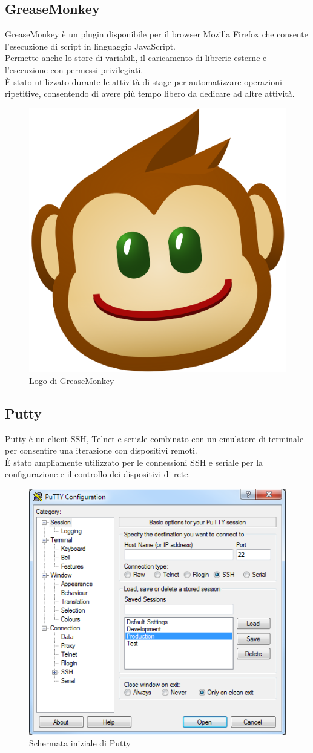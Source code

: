 \documentclass[Tesi.tex]{subfiles}
\begin{document}
\subsection{GreaseMonkey}
GreaseMonkey è un plugin disponibile per il browser Mozilla Firefox che consente l'esecuzione di script in linguaggio JavaScript. \\
Permette anche lo store di variabili, il caricamento di librerie esterne e l'esecuzione con permessi privilegiati. \\
\`{E} stato utilizzato durante le attività di stage per automatizzare operazioni ripetitive, consentendo di avere più tempo libero da dedicare ad altre attività.
\begin{figure}[H]
	\centering
	\includegraphics[width=0.14\linewidth]{"images/logo/GreaseMonkey_logo"}
	\caption{Logo di GreaseMonkey}
	\label{fig:Logo di GreaseMonkey}
\end{figure}

\subsection{Putty}
Putty è un client SSH, Telnet e seriale combinato con un emulatore di terminale per consentire una iterazione con dispositivi remoti. \\
\`{E} stato ampliamente utilizzato per le connessioni SSH e seriale per la configurazione e il controllo dei dispositivi di rete.
\begin{figure}[H]
	\centering
	\includegraphics[width=0.62\linewidth]{"images/putty"}
	\caption{Schermata iniziale di Putty}
	\label{fig:Schermata iniziale di Putty}
\end{figure}
\end{document}
